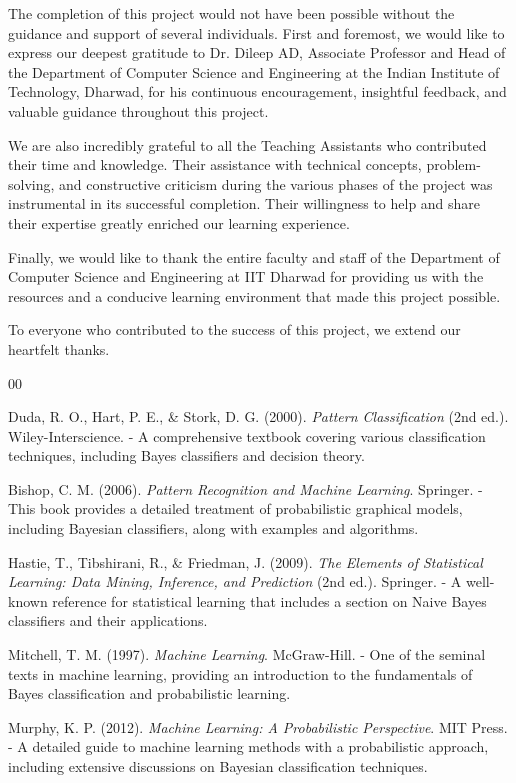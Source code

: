 \documentclass[conference]{IEEEtran}
\begin{document}
The completion of this project would not have been possible without the guidance and support of several individuals. First and foremost, we would like to express our deepest gratitude to Dr. Dileep AD, Associate Professor and Head of the Department of Computer Science and Engineering at the Indian Institute of Technology, Dharwad, for his continuous encouragement, insightful feedback, and valuable guidance throughout this project.

We are also incredibly grateful to all the Teaching Assistants who contributed their time and knowledge. Their assistance with technical concepts, problem-solving, and constructive criticism during the various phases of the project was instrumental in its successful completion. Their willingness to help and share their expertise greatly enriched our learning experience.

Finally, we would like to thank the entire faculty and staff of the Department of Computer Science and Engineering at IIT Dharwad for providing us with the resources and a conducive learning environment that made this project possible.

To everyone who contributed to the success of this project, we extend our heartfelt thanks.



\begin{thebibliography}{00}

 Duda, R. O., Hart, P. E., \& Stork, D. G. (2000). \textit{Pattern Classification} (2nd ed.). Wiley-Interscience.
- A comprehensive textbook covering various classification techniques, including Bayes classifiers and decision theory.

 Bishop, C. M. (2006). \textit{Pattern Recognition and Machine Learning}. Springer.
- This book provides a detailed treatment of probabilistic graphical models, including Bayesian classifiers, along with examples and algorithms.

 Hastie, T., Tibshirani, R., \& Friedman, J. (2009). \textit{The Elements of Statistical Learning: Data Mining, Inference, and Prediction} (2nd ed.). Springer.
- A well-known reference for statistical learning that includes a section on Naive Bayes classifiers and their applications.

 Mitchell, T. M. (1997). \textit{Machine Learning}. McGraw-Hill.
- One of the seminal texts in machine learning, providing an introduction to the fundamentals of Bayes classification and probabilistic learning.

 Murphy, K. P. (2012). \textit{Machine Learning: A Probabilistic Perspective}. MIT Press.
- A detailed guide to machine learning methods with a probabilistic approach, including extensive discussions on Bayesian classification techniques.

\end{thebibliography}
\end{document}

